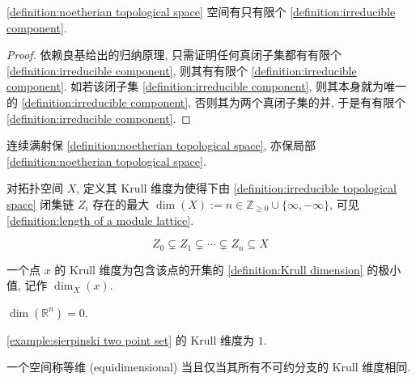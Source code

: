 \begin{lemma}
    \ref{definition:noetherian topological space} 空间有只有限个 \ref{definition:irreducible component}.

    \begin{proof}
        依赖良基给出的归纳原理, 只需证明任何真闭子集都有有限个 \ref{definition:irreducible component}, 则其有有限个 \ref{definition:irreducible component}.
        如若该闭子集 \ref{definition:irreducible component}, 则其本身就为唯一的 \ref{definition:irreducible component}, 否则其为两个真闭子集的并, 于是有有限个 \ref{definition:irreducible component}.
    \end{proof}
\end{lemma}

\begin{lemma}
    连续满射保 \ref{definition:noetherian topological space}, 亦保局部 \ref{definition:noetherian topological space}.
\end{lemma}

\begin{definition}[Krull 维度]
    \label {definition:Krull dimension}
    对拓扑空间 \(X\), 定义其 Krull 维度为使得下由 \ref{definition:irreducible topological space} 闭集链 \(Z_i\) 存在的最大 \(\dim (X) := n \in \mathbb{Z}_{\geq 0} \cup \{\infty, - \infty\}\), 可见 \ref{definition:length of a module lattice}.

    \[
        Z_0 \subsetneq Z_1 \subsetneq \cdots \subsetneq Z_n \subseteq X
    \]
\end{definition}

\begin{definition}
    一个点 \(x\) 的 Krull 维度为包含该点的开集的 \ref{definition:Krull dimension} 的极小值,
    记作 \(\dim_X (x)\).
\end{definition}

\begin{example}
    \(\dim (\mathbb{R}^n) = 0\).
\end{example}

\begin{example}
    \ref{example:sierpinski two point set} 的 Krull 维度为 \(1\).
\end{example}

\begin{definition}[等维]
    \label {definition:equidimensional topological space}
    一个空间称等维 (equidimensional) 当且仅当其所有不可约分支的 Krull 维度相同.
\end{definition}

